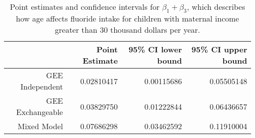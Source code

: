 \begin{table}[ht]
\centering
\begingroup\small
\begin{tabular}{rrrr}
  \toprule
 & Point Estimate & 95\% CI lower bound & 95\% CI upper bound \\ 
  \midrule
GEE Independent & 0.02810417 & 0.00115686 & 0.05505148 \\ 
  GEE Exchangeable & 0.03829750 & 0.01222844 & 0.06436657 \\ 
  Mixed Model & 0.07686298 & 0.03462592 & 0.11910004 \\ 
   \bottomrule
\end{tabular}
\endgroup
\caption{Point estimates and confidence intervals for $\beta_1 + \beta_3$, which describes how age affects fluoride intake for children with maternal income greater than 30 thousand dollars per year.} 
\label{tab:beta_1_3_intervals}
\end{table}
